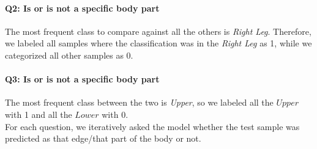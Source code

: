 \paragraph{Q2: Is or is not a specific body part} The most frequent class to compare against all the others is \textit{Right Leg}.
Therefore, we labeled all samples where the classification was in the \textit{Right Leg} as 1, while we categorized all other samples as 0.

\paragraph{Q3: Is or is not a specific body part} The most frequent class between the two is \textit{Upper}, so we labeled all the $Upper$ with 1 and all the $Lower$ with 0.\\

For each question, we iteratively asked the model whether the test sample was predicted as that edge/that part of the body or not.
